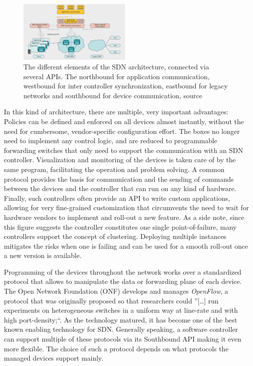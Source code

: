 \begin{figure}[h]
	\centering
	\includegraphics[width=0.49\textwidth]{images/sdnAPIs.png}
	\caption{The different elements of the SDN architecture, connected via several APIs. The northbound for application communication, westbound for inter controller synchronization, eastbound for legacy networks and southbound for device communication, source \cite{jarschel2014interfaces}}
	\label{img:sdnAPIs}
\end{figure}

In this kind of architecture, there are multiple, very important advantages: Policies can be defined and enforced on all devices almost instantly, without the need for cumbersome, vendor-specific configuration effort. The boxes no longer need to implement any control logic, and are reduced to programmable forwarding switches that only need to support the communication with an SDN controller. Visualization and monitoring of the devices is taken care of by the same program, facilitating the operation and problem solving. A common protocol provides the basis for communication and the sending of commands between the devices and the controller that can run on any kind of hardware. Finally, such controllers often provide an API to write custom applications, allowing for very fine-grained customization that circumvents the need to wait for hardware vendors to implement and roll-out a new feature. As a side note, since this figure suggests the controller constitutes one single point-of-failure, many controllers support the concept of clustering. Deploying multiple instances mitigates the risks when one is failing and can be used for a smooth roll-out once a new version is available.  

Programming of the devices throughout the network works over a standardized protocol that allows to manipulate the data or forwarding plane of each device. The Open Network Foundation (ONF) develops and manages \textit{OpenFlow}, a protocol that was originally proposed so that researchers could ''[\dots] run experiments on heterogeneous switches in a uniform way at line-rate and with high port-density;``\cite{mckeown2008openflow}. As the technology matured, it has become one of the best known enabling technology for SDN. Generally speaking, a software controller can support multiple of these protocols via its Southbound API making it even more flexible. The choice of such a protocol depends on what protocols the managed devices support mainly. 

